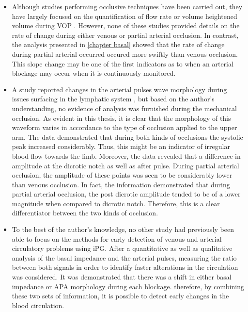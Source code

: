 \begin{itemize}
	\item Although studies performing occlusive techniques have been carried out, they have largely focused on the quantification of flow rate or volume heightened volume during VOP \cite{mohapatra1979measurement, costeloe1980continuous, yamakoshi1980limb}. However, none of these studies provided details on the rate of change during either venous or partial arterial occlusion. In contrast, the analysis presented in \ref{chapter basal} showed that the rate of change during partial arterial occurred occured more swiftly than venous occlusion. This slope change may be one of the first indicators as to when an arterial blockage may  occur when it is continuously monitored. 
	\item A study reported changes in the arterial pulses wave morphology during issues surfacing in the lymphatic system \cite{montgomery2011segmental}, but based on the author's understanding, no evidence of analysis was furnished during the mechanical occlusion. As evident in this thesis, it is clear that the morphology of this waveform varies in accordance to the type of occlusion applied to the upper arm. The data demonstrated that during both kinds of occlusions the systolic peak increased considerably. Thus, this might be an indicator of irregular blood flow towards the limb. Moreover, the data revealed that a difference in amplitude at the dicrotic notch as well as after pulse. During partial arterial occlusion, the amplitude of these points was seen to be considerably lower than venous occlusion. In fact, the information  demonstrated that during partial arterial occlusion, the post dicrotic amplitude tended to be of a lower magnitude when compared to dicrotic notch. Therefore, this is a clear differentiator between the two kinds of occlusion.
	\item To the best of the author's knowledge, no other study had previously been able to focus on the methods for early detection of venous and arterial circulatory problems using iPG. After a quantitative as well as qualitative analysis of the basal impedance and the arterial pulses, measuring the ratio between both signals in order to identify faster alterations in the circulation was considered. It was demonstrated that there was a shift in either basal impedance or APA morphology during each blockage. therefore, by combining these two sets of information, it is possible to detect early changes in the blood circulation.
\end{itemize} 

